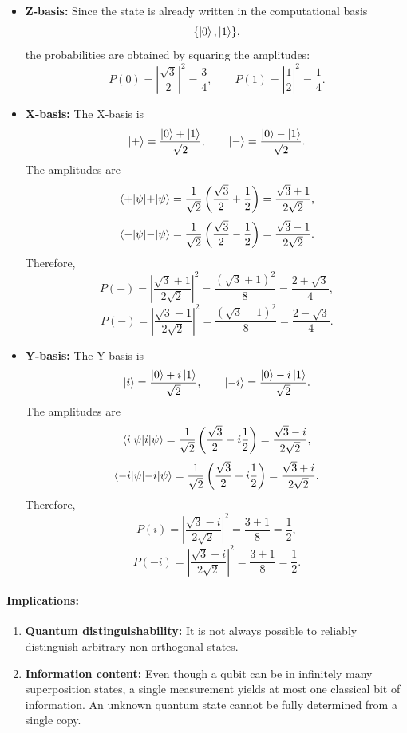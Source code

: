 \documentclass[10pt,a4paper]{article}
\begin{document}
\begin{itemize}[nosep]
    \item \textbf{Z-basis:}
    Since the state is already written in the computational basis
    \[
    \{\ket{0},\ket{1}\},
    \]
    the probabilities are obtained by squaring the amplitudes:
    \[
    P(0)=\left|\frac{\sqrt{3}}{2}\right|^2=\frac{3}{4},
    \qquad
    P(1)=\left|\frac{1}{2}\right|^2=\frac{1}{4}.
    \]

    \item \textbf{X-basis:}
    The X-basis is
    \[
    \ket{+}=\frac{\ket{0}+\ket{1}}{\sqrt{2}},
    \qquad
    \ket{-}=\frac{\ket{0}-\ket{1}}{\sqrt{2}}.
    \]
    The amplitudes are
    \[
    \braket{+|\psi}
    =
    \frac{1}{\sqrt{2}}
    \left(
    \frac{\sqrt{3}}{2}+\frac{1}{2}
    \right)
    =
    \frac{\sqrt{3}+1}{2\sqrt{2}},
    \]
    \[
    \braket{-|\psi}
    =
    \frac{1}{\sqrt{2}}
    \left(
    \frac{\sqrt{3}}{2}-\frac{1}{2}
    \right)
    =
    \frac{\sqrt{3}-1}{2\sqrt{2}}.
    \]
    Therefore,
    \[
    P(+)
    =
    \left|\frac{\sqrt{3}+1}{2\sqrt{2}}\right|^2
    =
    \frac{(\sqrt{3}+1)^2}{8}
    =
    \frac{2+\sqrt{3}}{4},
    \]
    \[
    P(-)
    =
    \left|\frac{\sqrt{3}-1}{2\sqrt{2}}\right|^2
    =
    \frac{(\sqrt{3}-1)^2}{8}
    =
    \frac{2-\sqrt{3}}{4}.
    \]

    \item \textbf{Y-basis:}
    The Y-basis is
    \[
    \ket{i}=\frac{\ket{0}+i\ket{1}}{\sqrt{2}},
    \qquad
    \ket{-i}=\frac{\ket{0}-i\ket{1}}{\sqrt{2}}.
    \]
    The amplitudes are
    \[
    \braket{i|\psi}
    =
    \frac{1}{\sqrt{2}}
    \left(
    \frac{\sqrt{3}}{2}-i\frac{1}{2}
    \right)
    =
    \frac{\sqrt{3}-i}{2\sqrt{2}},
    \]
    \[
    \braket{-i|\psi}
    =
    \frac{1}{\sqrt{2}}
    \left(
    \frac{\sqrt{3}}{2}+i\frac{1}{2}
    \right)
    =
    \frac{\sqrt{3}+i}{2\sqrt{2}}.
    \]
    Therefore,
    \[
    P(i)
    =
    \left|\frac{\sqrt{3}-i}{2\sqrt{2}}\right|^2
    =
    \frac{3+1}{8}
    =
    \frac{1}{2},
    \]
    \[
    P(-i)
    =
    \left|\frac{\sqrt{3}+i}{2\sqrt{2}}\right|^2
    =
    \frac{3+1}{8}
    =
    \frac{1}{2}.
    \]
\end{itemize}

\paragraph{Implications:}
\begin{enumerate}[nosep]
\item \textbf{Quantum distinguishability:} It is not always possible to reliably distinguish arbitrary non-orthogonal states.
\item \textbf{Information content:} Even though a qubit can be in infinitely many superposition states, a single measurement yields at most one classical bit of information. An unknown quantum state cannot be fully determined from a single copy.
\end{enumerate}
\end{document}
